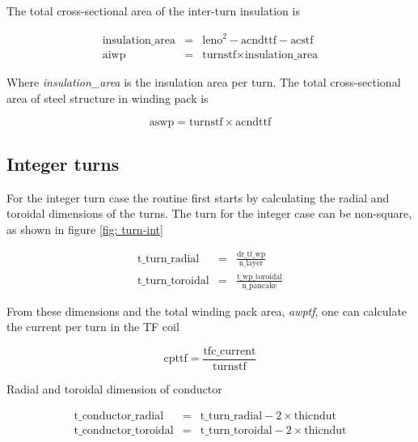 \documentclass[hidelinks]{article}
\numberwithin{equation}{section}
\begin{document}
       \noi The total cross-sectional area of the inter-turn insulation is 

       \begin{eqnarray}
           \text{insulation\_area} &=& \text{leno}^2 - \text{acndttf} - \text{acstf}\\
           \text{aiwp} &=& \text{turnstf} \times \text{insulation\_area}
       \end{eqnarray}
   
       \noi Where \emph{insulation\_area} is the insulation area per turn. The total cross-sectional 
       area of steel structure in winding pack is
   
       \begin{equation}
           \text{aswp} = \text{turnstf} \times \text{acndttf}
       \end{equation}

    \subsection{Integer turns}

    \noi For the integer turn case the routine first starts by calculating the radial and 
    toroidal dimensions of the turns. The turn for the integer case can be non-square, as 
    shown in figure \ref{fig: turn-int}

    \begin{eqnarray}
        \text{t\_turn\_radial} &=& \frac{\text{dr\_tf\_wp}}{\text{n\_layer}} \\
        \text{t\_turn\_toroidal} &=& \frac{\text{t\_wp\_toroidal}}{\text{n\_pancake}}
    \end{eqnarray}

    \noi From these dimensions and the total winding pack area, \emph{awptf}, one can calculate 
    the current per turn in the TF coil

    \begin{equation}
        \text{cpttf} = \frac{\text{tfc\_current}}{\text{turnstf}}
    \end{equation}

    \noi Radial and toroidal dimension of conductor
    
    \begin{eqnarray}
        \text{t\_conductor\_radial} &=& \text{t\_turn\_radial} - 2 \times \text{thicndut}\\
        \text{t\_conductor\_toroidal} &=& \text{t\_turn\_toroidal} - 2 \times \text{thicndut}
    \end{eqnarray}
\end{document}
